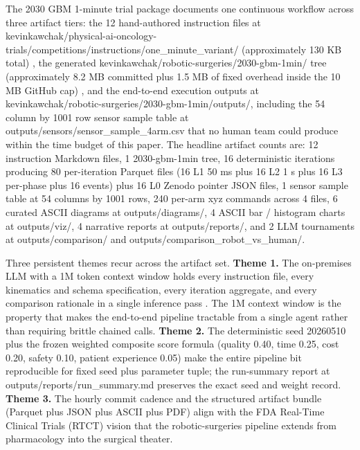 
The 2030 GBM 1-minute trial package documents one continuous
workflow across three artifact tiers: the 12 hand-authored
instruction files at
kevinkawchak/physical-ai-oncology-trials/competitions/instructions/one_minute_variant/
(approximately 130 KB total)
\cite{one-minute-variant-instructions}, the generated
kevinkawchak/robotic-surgeries/2030-gbm-1min/ tree (approximately
8.2 MB committed plus 1.5 MB of fixed overhead inside the 10 MB
GitHub cap) \cite{repo-robotic-surgeries}, and the end-to-end
execution outputs at
kevinkawchak/robotic-surgeries/2030-gbm-1min/outputs/, including the
54 column by 1001 row sensor sample table at
outputs/sensors/sensor_sample_4arm.csv that no human team could
produce within the time budget of this paper. The headline artifact
counts are: 12 instruction Markdown files, 1 2030-gbm-1min tree, 16
deterministic iterations producing 80 per-iteration Parquet files
(16 L1 50 ms plus 16 L2 1 s plus 16 L3 per-phase plus 16 events)
plus 16 L0 Zenodo pointer JSON files, 1 sensor sample table at 54
columns by 1001 rows, 240 per-arm xyz commands across 4 files, 6
curated ASCII diagrams at outputs/diagrams/, 4 ASCII bar / histogram
charts at outputs/viz/, 4 narrative reports at outputs/reports/, and
2 LLM tournaments at outputs/comparison/ and
outputs/comparison_robot_vs_human/.

Three persistent themes recur across the artifact set.
\textbf{Theme 1.} The on-premises LLM with a 1M token context window
holds every instruction file, every kinematics and schema
specification, every iteration aggregate, and every comparison
rationale in a single inference pass \cite{claude-opus-47,
claude-code}. The 1M context window is the property that makes the
end-to-end pipeline tractable from a single agent rather than
requiring brittle chained calls. \textbf{Theme 2.} The deterministic
seed 20260510 plus the frozen weighted composite score formula
(quality 0.40, time 0.25, cost 0.20, safety 0.10, patient experience
0.05) make the entire pipeline bit reproducible for fixed seed plus
parameter tuple; the run-summary report at
outputs/reports/run_summary.md preserves the exact seed and weight
record. \textbf{Theme 3.} The hourly commit cadence and the
structured artifact bundle (Parquet plus JSON plus ASCII plus PDF)
align with the FDA Real-Time Clinical Trials (RTCT) vision
\cite{fda2026realtime} that the robotic-surgeries pipeline extends
from pharmacology into the surgical theater.

